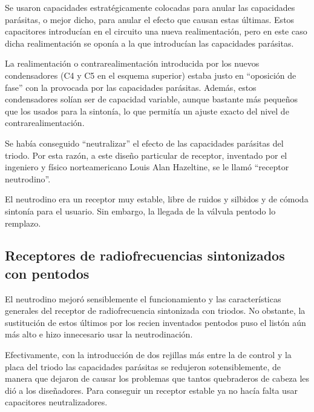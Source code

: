 \documentclass[letterpaper,10pt,spanish]{sphinxmanual}
\let\sphinxpxdimen\pdfpxdimen\else\newdimen\sphinxpxdimen
\begin{document}
Se usaron capacidades estratégicamente colocadas para anular las capacidades parásitas, o mejor dicho, para anular el efecto que causan estas últimas. Estos capacitores introducían en el circuito una nueva realimentación, pero en este caso dicha realimentación se oponía a la que introducían las capacidades parásitas.

\sphinxincludegraphics[width=588\sphinxpxdimen,height=226\sphinxpxdimen]{{receprfs3low}.png}

La realimentación o contra\sphinxhyphen{}realimentación introducida por los nuevos condensadores (C4 y C5 en el esquema superior) estaba justo en “oposición de fase” con la provocada por las capacidades parásitas. Además, estos condensadores solían ser de capacidad variable, aunque bastante más pequeños que los usados para la sintonía, lo que permitía un ajuste exacto del nivel de contra\sphinxhyphen{}realimentación.

Se había conseguido “neutralizar” el efecto de las capacidades parásitas del triodo. Por esta razón, a este diseño particular de receptor, inventado por el ingeniero y físico norteamericano Louis Alan Hazeltine, se le llamó “receptor neutrodino”.

El neutrodino era un receptor muy estable, libre de ruidos y silbidos y de cómoda sintonía para el usuario. Sin embargo, la llegada de la válvula pentodo lo remplazo.


\subsection{Receptores de radiofrecuencias sintonizados con pentodos}
\label{\detokenize{introduccion/sistemas:Receptores-de-radiofrecuencias-sintonizados-con-pentodos}}
El neutrodino mejoró sensiblemente el funcionamiento y las características generales del receptor de radiofrecuencia sintonizada con triodos. No obstante, la sustitución de estos últimos por los recien inventados pentodos puso el listón aún más alto e hizo innecesario usar la neutrodinación.

Efectivamente, con la introducción de dos rejillas más entre la de control y la placa del triodo las capacidades parásitas se redujeron sotensiblemente, de manera que dejaron de causar los problemas que tantos quebraderos de cabeza les dió a los diseñadores. Para conseguir un receptor estable ya no hacía falta usar capacitores neutralizadores.

\sphinxincludegraphics[width=588\sphinxpxdimen,height=226\sphinxpxdimen]{{receprfs4low}.png}
\end{document}
